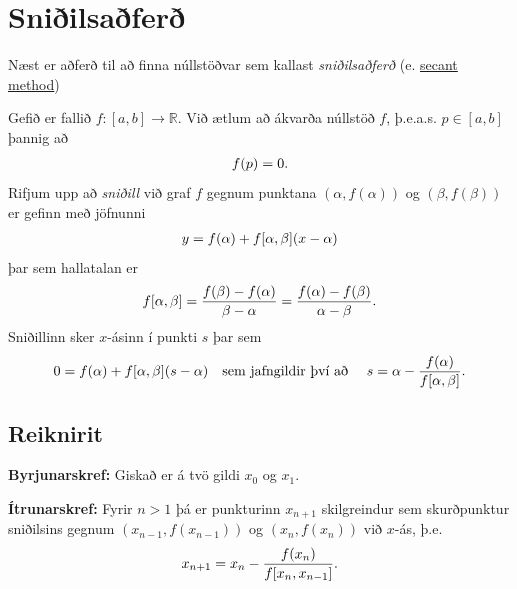 \documentclass[letterpaper,10pt,icelandic]{sphinxmanual}
\begin{document}
\section{Sniðilsaðferð}
\label{kafli02:index-5}\label{kafli02:sniilsafer}
Næst er aðferð til að finna núllstöðvar sem kallast \emph{sniðilsaðferð}
(e. \href{https://en.wikipedia.org/wiki/Secant\_method}{secant method})

Gefið er fallið \(f:[a,b]\to {\mathbb  R}\). Við ætlum að ákvarða
núllstöð \(f\), þ.e.a.s. \(p\in [a,b]\) þannig að
\begin{gather}
\begin{split}f(p)=0.\end{split}\notag
\end{gather}
Rifjum upp að \emph{sniðill} við graf \(f\) gegnum punktana
\((\alpha,f(\alpha))\) og \((\beta,f(\beta))\) er gefinn með
jöfnunni
\begin{gather}
\begin{split}y=f(\alpha)+f[\alpha,\beta](x-\alpha)\end{split}\notag
\end{gather}
þar sem hallatalan er
\begin{gather}
\begin{split}f[\alpha,\beta]=\dfrac{f(\beta)-f(\alpha)}{\beta-\alpha}
=\dfrac{f(\alpha)-f(\beta)}{\alpha -\beta}.\end{split}\notag
\end{gather}
Sniðillinn sker \(x\)-ásinn í punkti \(s\) þar sem
\begin{gather}
\begin{split}0=f(\alpha)+f[\alpha,\beta](s-\alpha) \quad  \text{sem jafngildir því að } \quad
s=\alpha-\dfrac{f(\alpha)}{f[\alpha,\beta]}.\end{split}\notag
\end{gather}

\subsection{Reiknirit}
\label{kafli02:id2}
\textbf{Byrjunarskref:} Giskað er á tvö gildi \(x_0\) og \(x_1\).

\textbf{Ítrunarskref:} Fyrir \(n>1\) þá er punkturinn \(x_{n+1}\)
skilgreindur sem skurðpunktur sniðilsins gegnum \((x_{n-1},f(x_{n-1}))\) og
\((x_n,f(x_n))\) við \(x\)-ás, þ.e.
\begin{gather}
\begin{split}x_{n+1}=x_n-\dfrac{f(x_n)}{f[x_n,x_{n-1}]}.\end{split}\notag
\end{gather}
\end{document}
